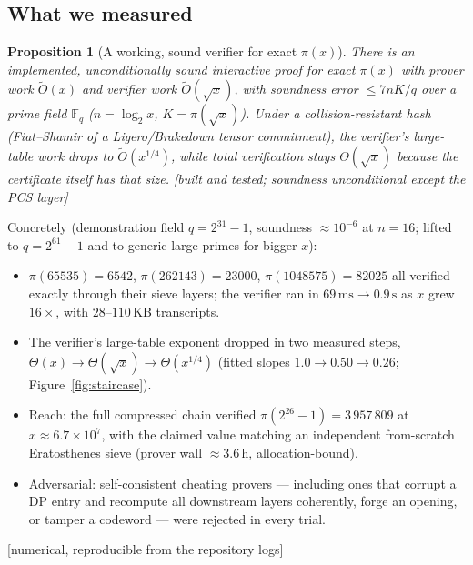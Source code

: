 \documentclass[11pt]{article}
\theoremstyle{plain}
\newtheorem{proposition}[theorem]{Proposition}
\theoremstyle{definition}
\theoremstyle{remark}
\newcommand{\stat}[1]{\quad\textnormal{\footnotesize\textsf{[\textcolor{accent}{#1}]}}}
\newcommand{\Otil}{\widetilde{O}}
\begin{document}
\subsection{What we measured}

\begin{proposition}[A working, sound verifier for exact $\pi(x)$]
\label{prop:verifier}
There is an implemented, unconditionally sound interactive proof for exact
$\pi(x)$ with prover work $\Otil(x)$ and verifier work $\Otil(\sqrt{x})$, with
soundness error $\le 7nK/q$ over a prime field $\mathbb{F}_q$ ($n=\log_2 x$,
$K=\pi(\sqrt{x})$). Under a collision-resistant hash (Fiat--Shamir of a
Ligero/Brakedown tensor commitment), the verifier's \emph{large-table} work drops
to $\Otil(x^{1/4})$, while total verification stays $\Theta(\sqrt{x})$ because the
certificate itself has that size.
\stat{built and tested; soundness unconditional except the PCS layer}
\end{proposition}

Concretely (demonstration field $q=2^{31}-1$, soundness ${\approx}10^{-6}$ at
$n=16$; lifted to $q=2^{61}-1$ and to generic large primes for bigger $x$):
\begin{itemize}[leftmargin=1.4em,itemsep=2pt]
\item $\pi(65535)=6542$, $\pi(262143)=23000$, $\pi(1048575)=82025$ all verified
exactly through their sieve layers; the verifier ran in $69\,\mathrm{ms}\to0.9\,\mathrm{s}$
as $x$ grew $16\times$, with $28$--$110$\,KB transcripts.
\item The verifier's large-table exponent dropped in two measured steps,
$\Theta(x)\to\Theta(\sqrt{x})\to\Theta(x^{1/4})$ (fitted slopes $1.0\to0.50\to0.26$;
Figure~\ref{fig:staircase}).
\item Reach: the full compressed chain verified $\pi(2^{26}-1)=3\,957\,809$ at
$x\approx6.7\times10^7$, with the claimed value matching an independent
from-scratch Eratosthenes sieve (prover wall ${\approx}3.6$\,h, allocation-bound).
\item Adversarial: self-consistent cheating provers --- including ones that
corrupt a DP entry and recompute all downstream layers coherently, forge an
opening, or tamper a codeword --- were rejected in every trial.
\end{itemize}
\stat{numerical, reproducible from the repository logs}
\end{document}
